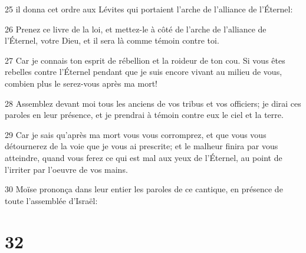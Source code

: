 \par 25 il donna cet ordre aux Lévites qui portaient l'arche de l'alliance de l'Éternel:
\par 26 Prenez ce livre de la loi, et mettez-le à côté de l'arche de l'alliance de l'Éternel, votre Dieu, et il sera là comme témoin contre toi.
\par 27 Car je connais ton esprit de rébellion et la roideur de ton cou. Si vous êtes rebelles contre l'Éternel pendant que je suis encore vivant au milieu de vous, combien plus le serez-vous après ma mort!
\par 28 Assemblez devant moi tous les anciens de vos tribus et vos officiers; je dirai ces paroles en leur présence, et je prendrai à témoin contre eux le ciel et la terre.
\par 29 Car je sais qu'après ma mort vous vous corromprez, et que vous vous détournerez de la voie que je vous ai prescrite; et le malheur finira par vous atteindre, quand vous ferez ce qui est mal aux yeux de l'Éternel, au point de l'irriter par l'oeuvre de vos mains.
\par 30 Moïse prononça dans leur entier les paroles de ce cantique, en présence de toute l'assemblée d'Israël:

\chapter{32}


